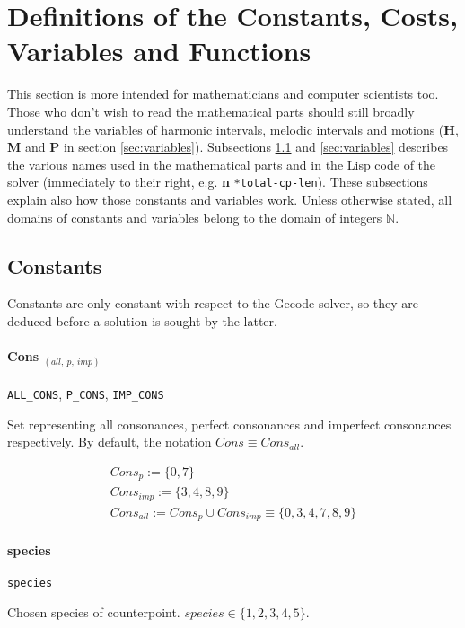\section{Definitions of the Constants, Costs, Variables and Functions}
This section is more intended for mathematicians and computer scientists too. Those who don't wish to read the mathematical parts should still broadly understand the variables of harmonic intervals, melodic intervals and motions (\textbf{H}, \textbf{M} and \textbf{P} in section \ref{sec:variables}). Subsections \ref{sec:constants} and \ref{sec:variables} describes the various names used in the mathematical parts and in the Lisp code of the solver (immediately to their right, e.g. \textbf{n} \space \texttt{*total-cp-len}). These subsections explain also how those constants and variables work. Unless otherwise stated, all domains of constants and variables belong to the domain of integers $\mathbb{N}$.

\subsection{Constants}\label{sec:constants}
Constants are only constant with respect to the Gecode solver, so they are deduced before a solution is sought by the latter.

\paragraph{Cons $_{(all,\ p,\ imp)}$} \texttt{ALL\_CONS}, \texttt{P\_CONS}, \texttt{IMP\_CONS}

Set representing all consonances, perfect consonances and imperfect consonances respectively. By default, the notation $Cons \equiv Cons_{all}$.

\begin{equation}
    \begin{gathered}
        Cons_{p} := \{0, 7\}\\
        Cons_{imp} := \{3, 4, 8, 9\}\\
        Cons_{all} := Cons_{p} \cup Cons_{imp} \equiv \{0, 3, 4, 7, 8, 9\}
    \end{gathered}
\end{equation}

\paragraph{species} \texttt{species}

Chosen species of counterpoint. $species \in \{1, 2, 3, 4, 5\}$.

